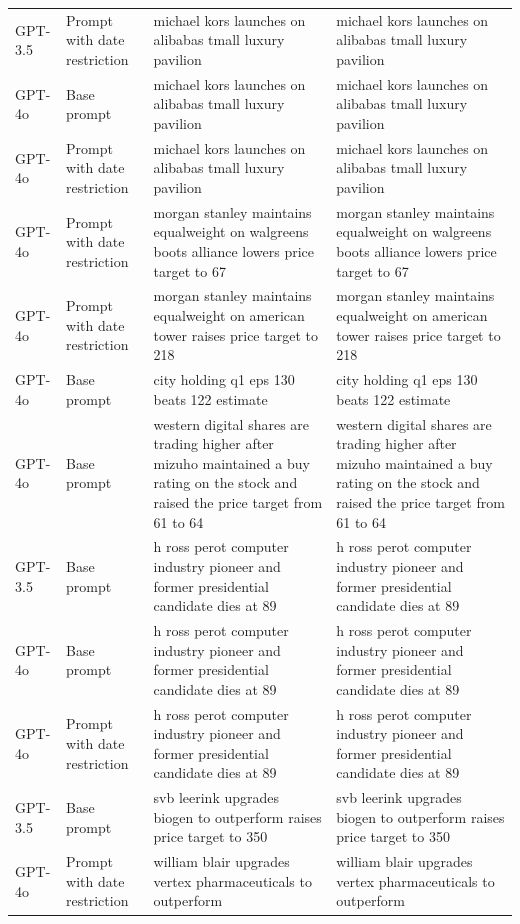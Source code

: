 \begin{longtable}{>{\raggedright\arraybackslash}p{1.4cm}>{\raggedright\arraybackslash}p{1.4cm}>{\raggedright\arraybackslash}p{5.5cm}>{\raggedright\arraybackslash}p{5.5cm}}
GPT-3.5 & Prompt with date restriction & michael kors launches on alibabas tmall luxury pavilion & michael kors launches on alibabas tmall luxury pavilion\\
GPT-4o & Base prompt & michael kors launches on alibabas tmall luxury pavilion & michael kors launches on alibabas tmall luxury pavilion\\
GPT-4o & Prompt with date restriction & michael kors launches on alibabas tmall luxury pavilion & michael kors launches on alibabas tmall luxury pavilion\\
GPT-4o & Prompt with date restriction & morgan stanley maintains equalweight on walgreens boots alliance lowers price target to 67 & morgan stanley maintains equalweight on walgreens boots alliance lowers price target to 67\\
GPT-4o & Prompt with date restriction & morgan stanley maintains equalweight on american tower raises price target to 218 & morgan stanley maintains equalweight on american tower raises price target to 218\\
GPT-4o & Base prompt & city holding q1 eps 130 beats 122 estimate & city holding q1 eps 130 beats 122 estimate\\
GPT-4o & Base prompt & western digital shares are trading higher after mizuho maintained a buy rating on the stock and raised the price target from 61 to 64 & western digital shares are trading higher after mizuho maintained a buy rating on the stock and raised the price target from 61 to 64\\
GPT-3.5 & Base prompt & h ross perot computer industry pioneer and former presidential candidate dies at 89 & h ross perot computer industry pioneer and former presidential candidate dies at 89\\
GPT-4o & Base prompt & h ross perot computer industry pioneer and former presidential candidate dies at 89 & h ross perot computer industry pioneer and former presidential candidate dies at 89\\
GPT-4o & Prompt with date restriction & h ross perot computer industry pioneer and former presidential candidate dies at 89 & h ross perot computer industry pioneer and former presidential candidate dies at 89\\
GPT-3.5 & Base prompt & svb leerink upgrades biogen to outperform raises price target to 350 & svb leerink upgrades biogen to outperform raises price target to 350\\
GPT-4o & Prompt with date restriction & william blair upgrades vertex pharmaceuticals to outperform & william blair upgrades vertex pharmaceuticals to outperform\\

\end{longtable}
